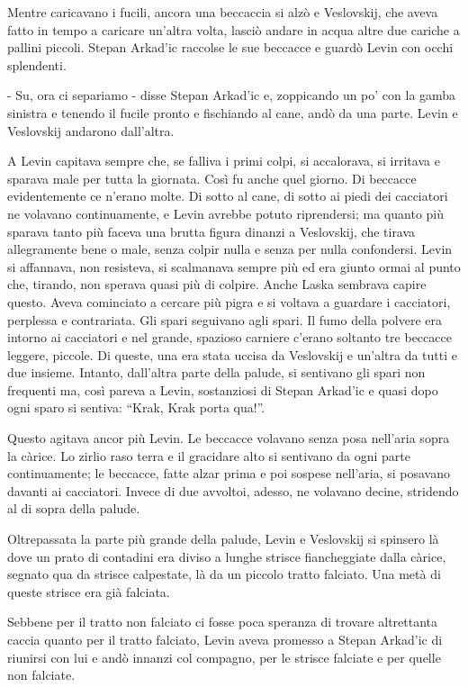 Mentre caricavano i fucili, ancora una beccaccia si alzò e Veslovskij, che aveva fatto in tempo a caricare un'altra volta, lasciò andare in acqua altre due cariche a pallini piccoli. Stepan Arkad'ic raccolse le sue beccacce e guardò Levin con occhi splendenti. 

- Su, ora ci separiamo - disse Stepan Arkad'ic e, zoppicando un po' con la gamba sinistra e tenendo il fucile pronto e fischiando al cane, andò da una parte. Levin e Veslovskij andarono dall'altra. 

A Levin capitava sempre che, se falliva i primi colpi, si accalorava, si irritava e sparava male per tutta la giornata. Così fu anche quel giorno. Di beccacce evidentemente ce n'erano molte. Di sotto al cane, di sotto ai piedi dei cacciatori ne volavano continuamente, e Levin avrebbe potuto riprendersi; ma quanto più sparava tanto più faceva una brutta figura dinanzi a Veslovskij, che tirava allegramente bene o male, senza colpir nulla e senza per nulla confondersi. Levin si affannava, non resisteva, si scalmanava sempre più ed era giunto ormai al punto che, tirando, non sperava quasi più di colpire. Anche Laska sembrava capire questo. Aveva cominciato a cercare più pigra e si voltava a guardare i cacciatori, perplessa e contrariata. Gli spari seguivano agli spari. Il fumo della polvere era intorno ai cacciatori e nel grande, spazioso carniere c'erano soltanto tre beccacce leggere, piccole. Di queste, una era stata uccisa da Veslovskij e un'altra da tutti e due insieme. Intanto, dall'altra parte della palude, si sentivano gli spari non frequenti ma, così pareva a Levin, sostanziosi di Stepan Arkad'ic e quasi dopo ogni sparo si sentiva: ``Krak, Krak porta qua!''. 

Questo agitava ancor più Levin. Le beccacce volavano senza posa nell'aria sopra la càrice. Lo zirlio raso terra e il gracidare alto si sentivano da ogni parte continuamente; le beccacce, fatte alzar prima e poi sospese nell'aria, si posavano davanti ai cacciatori. Invece di due avvoltoi, adesso, ne volavano decine, stridendo al di sopra della palude. 

Oltrepassata la parte più grande della palude, Levin e Veslovskij si spinsero là dove un prato di contadini era diviso a lunghe strisce fiancheggiate dalla càrice, segnato qua da strisce calpestate, là da un piccolo tratto falciato. Una metà di queste strisce era già falciata. 

Sebbene per il tratto non falciato ci fosse poca speranza di trovare altrettanta caccia quanto per il tratto falciato, Levin aveva promesso a Stepan Arkad'ic di riunirsi con lui e andò innanzi col compagno, per le strisce falciate e per quelle non falciate. 

